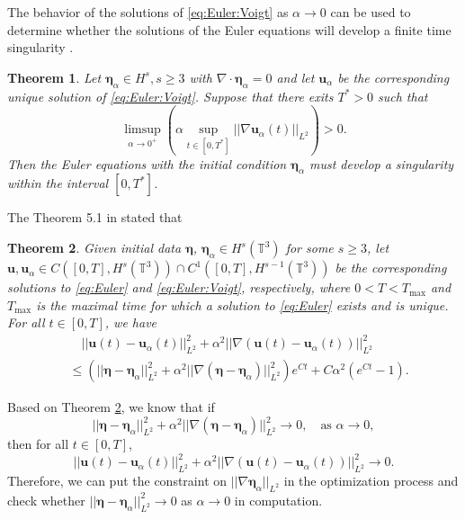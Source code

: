 \documentclass[leqno,10pt,a4paper]{amsart}
\newtheorem{thm}{Theorem}[section]
\theoremstyle{definition}
\numberwithin{equation}{section}
\newcommand{\mbb}[1]{\mathbb{#1}}
\newcommand{\bds}{\boldsymbol}
\def\bbeta{\boldsymbol{\eta}}
\begin{document}
The behavior of the solutions of \eqref{eq:Euler:Voigt} as $\alpha \to 0$ can be used to determine whether the solutions of the Euler equations will develop a finite time singularity \cite{Larios2018}. 
%
\begin{thm}
Let $\bds \eta_\alpha \in H^s, s \geq 3$ with $\nabla \cdot \bds \eta_\alpha  = 0$ and let $\bds u_\alpha$ be the corresponding unique solution of \eqref{eq:Euler:Voigt}. Suppose that there exits $T^* > 0$ such that
%
\begin{equation}
\limsup_{\alpha\to 0^+} \left(\alpha \sup_{t\in[0, T^*]} ||\nabla \bds u_\alpha(t)||_{L^2}\right) > 0.
\end{equation}
%
Then the Euler equations with the initial condition $\bds \eta_\alpha$ must develop a singularity within the interval $[0, T^*]$.
\end{thm}
%

The Theorem 5.1 in \cite{Larios:Titi:2010} stated that
%
\begin{thm} \label{thm:convergence}
Given initial data $\bbeta$, $\bbeta_\alpha \in H^s(\mbb T^3)$ for some $s\geq 3$, let $\bds u, \bds u_\alpha \in C([0, T], H^s(\mbb T^3)) \cap C^1([0, T], H^{s-1}(\mbb T^3))$ be the corresponding solutions
to \eqref{eq:Euler} and \eqref{eq:Euler:Voigt}, respectively, where $0 < T < T_{\max}$ and $T_{\max}$ is the maximal time for which a solution to \eqref{eq:Euler} exists and is unique. For all $t\in[0, T]$, we have
%
\begin{equation}
\begin{aligned}
&\quad ||\bds u(t) - \bds u_\alpha(t)||_{L^2}^2 
+ \alpha^2 ||\nabla(\bds u(t)- \bds u_\alpha(t))||_{L^2}^2 \\
&\leq \left(||\bds \eta - \bds \eta_\alpha||_{L^2}^2 
+ \alpha^2 ||\nabla(\bds \eta - \bds \eta_\alpha)||_{L^2}^2\right)e^{Ct}
+ C\alpha^2(e^{Ct} - 1).
\end{aligned}
\end{equation}
%
\end{thm}
Based on Theorem \ref{thm:convergence}, we know that if 
%
\begin{equation}
||\bds \eta - \bds \eta_\alpha||_{L^2}^2 
+ \alpha^2 ||\nabla(\bds \eta - \bds \eta_\alpha)||_{L^2}^2 \to 0, \quad \text{as } \alpha \to 0, 
\end{equation}
%
then for all $t\in[0, T]$, 
%
\begin{equation}
||\bds u(t) - \bds u_\alpha(t)||_{L^2}^2 
+ \alpha^2 ||\nabla(\bds u(t) - \bds u_\alpha(t))||_{L^2}^2 \to 0.
\end{equation}
%
Therefore, we can put the constraint on $||\nabla\bbeta_\alpha||_{L^2}$ in the optimization process and check whether 
$||\bds \eta - \bds \eta_\alpha||_{L^2}^2 \to 0$ as $\alpha \to 0$ in computation.
\end{document}
